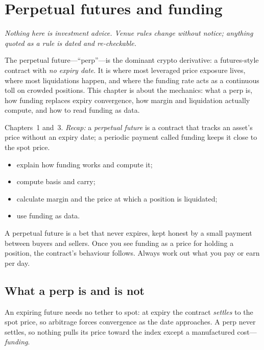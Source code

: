 \chapter{Perpetual futures and funding}\label{ch:perp}

\noindent\emph{Nothing here is investment advice. Venue rules change without notice; anything quoted
as a rule is dated and re-checkable.}\medskip

\noindent The perpetual future---``perp''---is the dominant crypto derivative: a futures-style
contract with \emph{no expiry date}. It is where most leveraged price exposure lives, where most
liquidations happen, and where the funding rate acts as a continuous toll on crowded positions.
This chapter is about the mechanics: what a perp is, how funding replaces expiry convergence,
how margin and liquidation actually compute, and how to read funding as data.

\begin{rulebox}
Chapters~1 and~3. \emph{Recap:} a \emph{perpetual future} is a contract that tracks an asset's price without an expiry date; a periodic payment called funding keeps it close to the spot price.
\end{rulebox}
\begin{wins}
\begin{itemize}
\item explain how funding works and compute it;
\item compute basis and carry;
\item calculate margin and the price at which a position is liquidated;
\item use funding as data.
\end{itemize}
\end{wins}
\begin{principle}
A perpetual future is a bet that never expires, kept honest by a small payment between buyers and sellers. Once you see funding as a price for holding a position, the contract's behaviour follows. Always work out what you pay or earn per day.
\end{principle}

\section{What a perp is and is not}\label{sec:whatperp}

An expiring future needs no tether to spot: at expiry the contract \emph{settles} to the spot
price, so arbitrage forces convergence as the date approaches. A perp never settles, so nothing
pulls its price toward the index except a manufactured cost---\emph{funding}.

